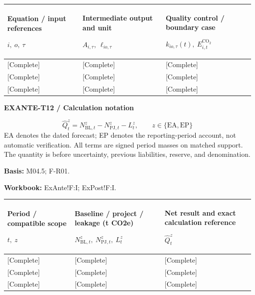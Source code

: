{\sffamily\fontsize{8.3}{10.3}\selectfont\begin{longtable}{@{}P{54.83mm} P{54.83mm} P{54.83mm}@{}}
\toprule
\textbf{Equation / input references}\par {\normalfont\fontsize{8.2}{10}\selectfont $i,\ o,\ \tau$} & \textbf{Intermediate output and unit}\par {\normalfont\fontsize{8.2}{10}\selectfont $A_{i,\tau},\ \ell_{io,\tau}$} & \textbf{Quality control / boundary case}\par {\normalfont\fontsize{8.2}{10}\selectfont $k_{io,\tau}(t),\ E^{\mathrm{CO_2}}_{i,t}$}\\\midrule\endhead
\rule{0pt}{8mm}[Complete] & [Complete] & [Complete]\\\hline
\rule{0pt}{8mm}[Complete] & [Complete] & [Complete]\\\hline
\rule{0pt}{8mm}[Complete] & [Complete] & [Complete]\\\hline
\end{longtable}}
\par\begingroup\sffamily\fontsize{8}{10}\selectfont\color{NEBGreen}\setlength{\parskip}{2pt}\setlength{\abovedisplayskip}{4pt}\setlength{\belowdisplayskip}{4pt}\setlength{\abovedisplayshortskip}{2pt}\setlength{\belowdisplayshortskip}{3pt}
\textbf{EXANTE-T12 / Calculation notation}\par
{\fontsize{9}{11}\selectfont\[ \widehat Q_t^z=N_{\mathrm{BL},t}^z-N_{\mathrm{PJ},t}^z-L_t^z,\qquad z\in\{\mathrm{EA},\mathrm{EP}\} \]}
EA denotes the dated forecast; EP denotes the reporting-period account, not automatic verification. All terms are signed period masses on matched support. The quantity is before uncertainty, previous liabilities, reserve, and denomination.\par
\textbf{Basis:} M04.5; F-R01.\par
\textbf{Workbook:} ExAnte!F:I; ExPost!F:I.\par\endgroup
{\sffamily\fontsize{8.3}{10.3}\selectfont\begin{longtable}{@{}P{54.83mm} P{54.83mm} P{54.83mm}@{}}
\toprule
\textbf{Period / compatible scope}\par {\normalfont\fontsize{8.2}{10}\selectfont $t,\ z$} & \textbf{Baseline / project / leakage (t CO2e)}\par {\normalfont\fontsize{8.2}{10}\selectfont $N_{\mathrm{BL},t}^z,\ N_{\mathrm{PJ},t}^z,\ L_t^z$} & \textbf{Net result and exact calculation reference}\par {\normalfont\fontsize{8.2}{10}\selectfont $\widehat Q_t^z$}\\\midrule\endhead
\rule{0pt}{8mm}[Complete] & [Complete] & [Complete]\\\hline
\rule{0pt}{8mm}[Complete] & [Complete] & [Complete]\\\hline
\rule{0pt}{8mm}[Complete] & [Complete] & [Complete]\\\hline
\end{longtable}}
